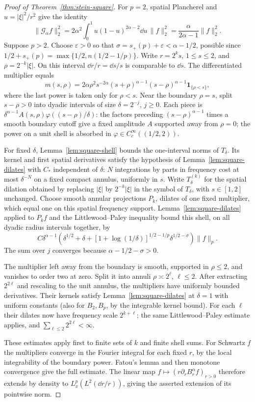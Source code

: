 \begin{proof}[Proof of Theorem~\ref{thm:stein-square}]
For \(p=2\), spatial Plancherel and \(u=|\xi|^2/r^2\) give the identity
\[
 \|\mathcal G_\alpha f\|_2^2
 =2\alpha^2\int_0^1 u(1-u)^{2\alpha-2}\dd u\,\|f\|_2^2
 =\frac{\alpha}{2\alpha-1}\|f\|_2^2.
\]
Suppose \(p>2\). Choose \(\varepsilon>0\) so that
\(\sigma=s_+(p)+\varepsilon<\alpha-1/2\), possible since
\(1/2+s_+(p)=\max\{1/2,n(1/2-1/p)\}\).
Write \(r=2^ks\), \(1\le s\le2\), and \(\rho=2^{-k}|\xi|\).
On this interval \(\dd r/r=\dd s/s\) is comparable to \(\dd s\).
The differentiated multiplier equals
\[
 m(s,\rho)=2\alpha\rho^2s^{-2\alpha}(s+\rho)^{\alpha-1}
             (s-\rho)^{\alpha-1}\mathbf1_{\{\rho<s\}} ,
\]
where the last power is taken only for \(\rho<s\).
Near the boundary \(\rho=s\), split \(s-\rho>0\) into dyadic intervals
of size \(\delta=2^{-j}\), \(j\ge0\). Each piece is
\(\delta^{\alpha-1}A(s,\rho)\varphi((s-\rho)/\delta)\):
the factors preceding \((s-\rho)^{\alpha-1}\) times a smooth boundary
cutoff give a fixed amplitude \(A\) supported away from \(\rho=0\);
the power on a unit shell is absorbed in
\(\varphi\in C_c^\infty((1/2,2))\).

For fixed \(\delta\), Lemma~\ref{lem:square-shell} bounds the one-interval
norms of \(T_\delta\). Its kernel and first spatial derivatives satisfy
the hypothesis of Lemma~\ref{lem:square-dilates} with \(C_*\) independent
of \(\delta\): \(N\) integrations by parts in frequency cost at most
\(\delta^{-N}\) on a fixed compact annulus, uniformly in \(s\).
Write \(T_\delta^{(k)}\) for the spatial dilation obtained by replacing
\(|\xi|\) by \(2^{-k}|\xi|\) in the symbol of \(T_\delta\), with
\(s\in[1,2]\) unchanged. Choose smooth annular projections \(P_k\),
dilates of one fixed multiplier, which equal one on this spatial
frequency support. Lemma~\ref{lem:square-dilates} applied to \(P_kf\)
and the Littlewood--Paley inequality bound this shell, on all dyadic
radius intervals together, by
\[
 C\delta^{\alpha-1}
 \left(\delta^{1/2}+\delta+
        [1+\log(1/\delta)]^{1/2-1/p}\delta^{1/2-\sigma}\right)\|f\|_p .
\]
The sum over \(j\) converges because \(\alpha-1/2-\sigma>0\).

The multiplier left away from the boundary is smooth, supported in
\(\rho\le2\), and vanishes to order two at zero. Split it into annuli
\(\rho\asymp 2^\ell\), \(\ell\le2\). After extracting \(2^{2\ell}\)
and rescaling to the unit annulus, the multipliers have uniformly
bounded derivatives. Their kernels satisfy Lemma~\ref{lem:square-dilates}
at \(\delta=1\) with uniform constants (also for \(B_2,B_p\), by
the integrable kernel bound). For each \(\ell\) their dilates now have
frequency scale \(2^{k+\ell}\); the same Littlewood--Paley estimate
applies, and \(\sum_{\ell\le2}2^{2\ell}<\infty\).

These estimates apply first to finite sets of \(k\) and finite shell
sums. For Schwartz \(f\) the multipliers converge in the Fourier integral
for each fixed \(r\), by the local integrability of the boundary power.
Fatou's lemma and then monotone convergence give the full estimate.
The linear map \(f\mapsto (r\partial_r B_r^\alpha f)_{r>0}\) therefore
extends by density to \(L^p_x(L^2(\dd r/r))\), giving the asserted
extension of its pointwise norm.
\end{proof}
